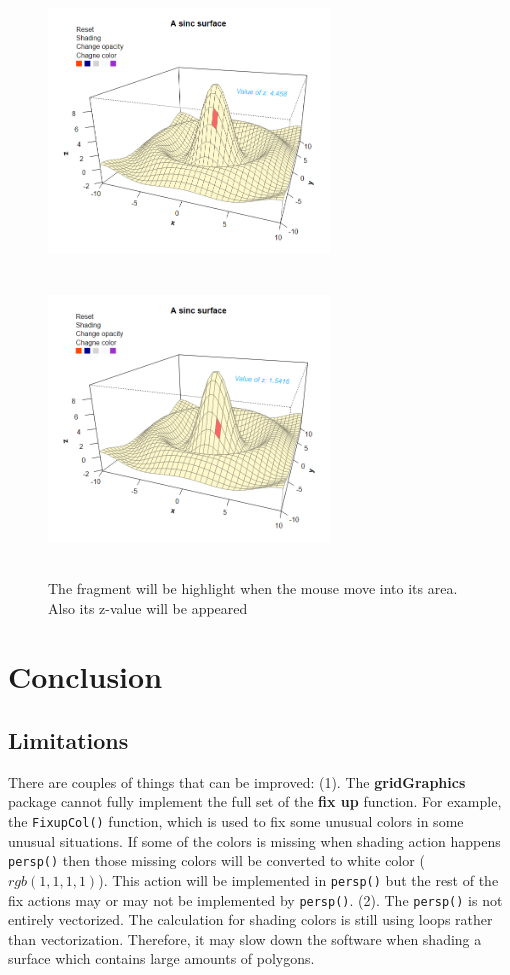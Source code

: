 \documentclass[11pt,twoside]{report}
\begin{document}
\begin{figure}[h]
	\begin{center}
		\includegraphics[height = 7.5cm, width = 7.5cm]{figure/svg/hlight_1.PNG}
		\includegraphics[height = 7.5cm, width = 7.5cm]{figure/svg/hlight_2.PNG}
		\caption{The fragment will be highlight when the mouse move into its area. Also its z-value will be appeared}
		\label{Example_6.3.4}
	\end{center}
\end{figure}

\chapter{Conclusion}

\section{Limitations}
There are couples of things that can be improved: (1). The \textbf{gridGraphics} package cannot fully implement the full set of the \textbf{fix up} function. For example, the \texttt{FixupCol()} function, which is used to fix some unusual colors in some unusual situations. If some of the colors is missing when shading action happens \texttt{persp()} then those missing colors will be converted to white color ($rgb(1, 1, 1, 1)$). This action will be implemented in \texttt{persp()} but the rest of the fix actions may or may not be implemented by \texttt{persp()}. (2). The \texttt{persp()} is not entirely vectorized. The calculation for shading colors is still using loops rather than vectorization. Therefore, it may slow down the software when shading a surface which contains large amounts of polygons. \\
\end{document}
